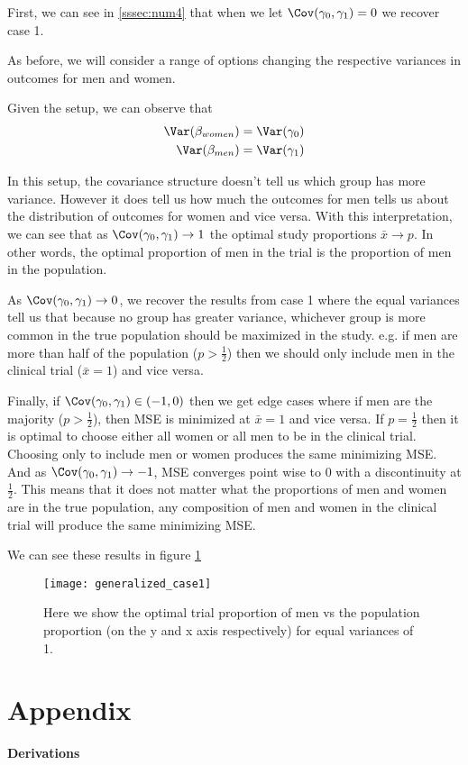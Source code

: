 First, we can see in \ref{sssec:num4} that when we let  $\Cov(\gamma_0, \gamma_1) = 0$ we recover case 1.

As before, we will consider a range of options changing the respective variances in outcomes for men and women.

Given the setup, we can observe that
\begin{align*}
	\Var(\beta_{women}) &= \Var(\gamma_0) \\
	\Var(\beta_{men}) &= \Var(\gamma_1)
\end{align*} 

In this setup, the covariance structure doesn't tell us which group has more variance. However it does tell us how much the outcomes for men tells us about the distribution of outcomes for women and vice versa. 
With this interpretation, we can see that as $\Cov(\gamma_0, \gamma_1) \to 1$ the optimal study proportions $\bar{x} \to p$. In other words, the optimal proportion of men in the trial is the proportion of men in the population.

As $\Cov(\gamma_0, \gamma_1) \to 0$, we recover the results from case 1 where the equal variances tell us that because no group has greater variance, whichever group is more common in the true population should be maximized in the study.  e.g. if men are more than half of the population ($p >  \frac{1}{2}$) then we should only include men in the clinical trial ($\bar{x} = 1$) and vice versa.

Finally, if $\Cov(\gamma_0, \gamma_1) \in (-1,0)$ then we get edge cases where if men are the majority ($p > \frac{1}{2}$), then MSE is minimized at $\bar{x} = 1$ and vice versa.
If $p=\frac{1}{2}$ then it is optimal to choose either all women or all men to be in the clinical trial. Choosing only to include men or women produces the same minimizing MSE. 
And as $\Cov(\gamma_0, \gamma_1) \to -1$, MSE converges point wise to 0 with a discontinuity at $\frac{1}{2}$. This means that it does not matter what the proportions of men and women are in the true population, any composition of men and women in the clinical trial will produce the same minimizing MSE.

We can see these results in figure \ref{fig:generalized_case1}

\begin{figure}[ht!]
  \centering
	\texttt{[image: generalized\_case1]}
	\caption{Here we show the optimal trial proportion of men vs the population proportion (on the y and x axis respectively) for equal variances of 1.} 
	\label{fig:generalized_case1}
\end{figure}


\section{Appendix}

\begin{center}
	{\large \bf Derivations }
\end{center}










